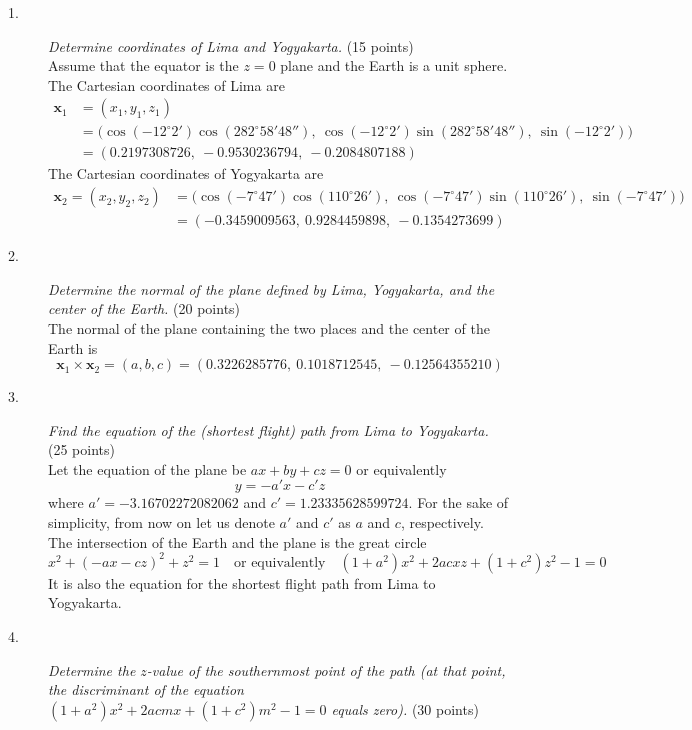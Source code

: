 \begin{description}
\item[1.] \emph{Determine coordinates of Lima and Yogyakarta.}
  \hfill(15 points)\\
  Assume that the equator is the $z = 0$ plane and the Earth is a unit
  sphere. The Cartesian coordinates of Lima are
  \begin{align*}
  \boldsymbol{x}_1 &= (x_1, y_1, z_1)\\
    &= \bigl(\cos(-12^\circ 2')\cos(282^\circ 58'48''),\
       \cos(-12^\circ 2')\sin(282^\circ 58'48''),\
       \sin(-12^\circ 2')\bigr)\\
    &= (0.2197308726,\ -0.9530236794,\ -0.2084807188)
  \end{align*}
  The Cartesian coordinates of Yogyakarta are
  \begin{align*}
  \boldsymbol{x}_2 = (x_2, y_2, z_2)
    &= \bigl(\cos(-7^\circ 47')\cos(110^\circ 26'),\
       \cos(-7^\circ 47')\sin(110^\circ 26'),\
       \sin(-7^\circ 47')\bigr)\\
    &= (-0.3459009563,\ 0.9284459898,\ -0.1354273699)
  \end{align*}
\item[2.] \emph{Determine the normal of the plane defined by Lima,
  Yogyakarta, and the center of the Earth.} \hfill(20 points)\\
  The normal of the plane containing the two places and the center of the
  Earth is
  \[ \boldsymbol{x}_1 \times \boldsymbol{x}_2 = (a, b, c)
     = (0.3226285776,\ 0.1018712545,\ -0.12564355210) \]
\item[3.] \emph{Find the equation of the (shortest flight) path from Lima to
  Yogyakarta.} \hfill(25 points)\\
  Let the equation of the plane be $ax + by + cz = 0$ or equivalently
  \[ y = -a'x - c'z \]
  where $a' = -3.16702272082062$ and $c' = 1.23335628599724$. For the sake
  of simplicity, from now on let us denote $a'$ and $c'$ as $a$ and $c$,
  respectively. The intersection of the Earth and the plane is the great
  circle
  \[ x^2 + (-ax - cz)^2 + z^2 = 1 \quad\text{or equivalently}\quad
     (1 + a^2)x^2 + 2acxz + (1 + c^2)z^2 - 1 = 0 \]
  It is also the equation for the shortest flight path from Lima to
  Yogyakarta.
  \ioaafig{2015_TH_S15-s1.pdf}
\item[4.] \emph{Determine the $z$-value of the southernmost point of the
  path (at that point, the discriminant of the equation
  $(1 + a^2)x^2 + 2acmx + (1 + c^2)m^2 - 1 = 0$ equals zero).}
  \hfill(30 points)\\

\end{description}

